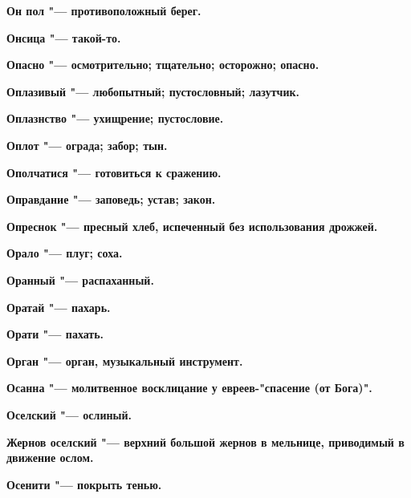\bfseries Он пол \normalfont{} "--- противоположный берег. 




\bfseries Онсица \normalfont{} "--- такой-то. 




\bfseries Опасно \normalfont{} "--- осмотрительно; тщательно; осторожно; опасно. 




\bfseries Оплазивый \normalfont{} "--- любопытный; пустословный; лазутчик. 




\bfseries Оплазнство \normalfont{} "--- ухищрение; пустословие. 




\bfseries Оплот \normalfont{} "--- ограда; забор; тын. 




\bfseries Ополчатися \normalfont{} "--- готовиться к сражению. 




\bfseries Оправдание \normalfont{} "--- заповедь; устав; закон. 




\bfseries Опреснок \normalfont{} "--- пресный хлеб, испеченный без использования дрожжей. 




\bfseries Орало \normalfont{} "--- плуг; соха. 




\bfseries Оранный \normalfont{} "--- распаханный. 




\bfseries Оратай \normalfont{} "--- пахарь. 




\bfseries Орати \normalfont{} "--- пахать. 




\bfseries Орган \normalfont{} "--- орган, музыкальный инструмент. 




\bfseries Осанна \normalfont{} "--- молитвенное восклицание у евреев-"спасение (от Бога)". 




\bfseries Оселский \normalfont{} "--- ослиный. 




\bfseries Жернов оселский \normalfont{} "--- верхний большой жернов в мельнице, приводимый в движение ослом. 




\bfseries Осенити \normalfont{} "--- покрыть тенью. 





